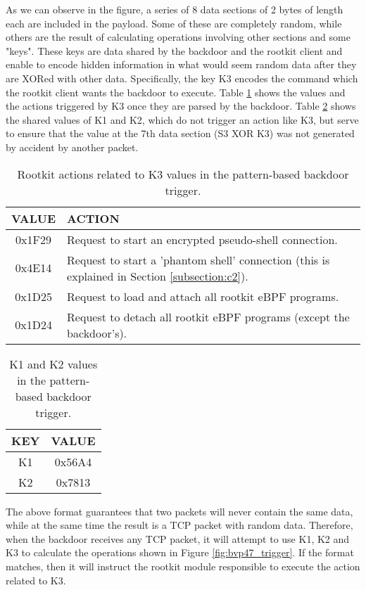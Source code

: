 As we can observe in the figure, a series of 8 data sections of 2 bytes of length each are included in the payload. Some of these are completely random, while others are the result of calculating operations involving other sections and some "keys". These keys are data shared by the backdoor and the rootkit client and enable to encode hidden information in what would seem random data after they are XORed with other data. Specifically, the key K3 encodes the command which the rootkit client wants the backdoor to execute. Table \ref{table:k3_values} shows the values and the actions triggered by K3 once they are parsed by the backdoor. Table \ref{table:k1_k2_values} shows the shared values of K1 and K2, which do not trigger an action like K3, but serve to ensure that the value at the 7th data section (S3 XOR K3) was not generated by accident by another packet.

\begin{table}[htbp]
\begin{tabular}{|c|>{\centering\arraybackslash}p{8cm}|}
\hline
\textbf{VALUE} & \textbf{ACTION}\\
\hline
\hline
0x1F29 & Request to start an encrypted pseudo-shell connection.\\
\hline
0x4E14 & Request to start a 'phantom shell' connection (this is explained in Section \ref{subsection:c2}).\\
\hline
0x1D25 & Request to load and attach all rootkit eBPF programs.\\
\hline
0x1D24 & Request to detach all rootkit eBPF programs (except the backdoor's).\\
\hline
\end{tabular}
\caption{Rootkit actions related to K3 values in the pattern-based backdoor trigger.}
\label{table:k3_values}
\end{table}

\begin{table}[htbp]
\begin{tabular}{|c|c|}
\hline
\textbf{KEY} & \textbf{VALUE}\\
\hline
\hline
K1 & 0x56A4\\
\hline
K2 & 0x7813\\
\hline
\end{tabular}
\caption{K1 and K2 values in the pattern-based backdoor trigger.}
\label{table:k1_k2_values}
\end{table}

The above format guarantees that two packets will never contain the same data, while at the same time the result is a TCP packet with random data. Therefore, when the backdoor receives any TCP packet, it will attempt to use K1, K2 and K3 to calculate the operations shown in Figure \ref{fig:bvp47_trigger}. If the format matches, then it will instruct the rootkit module responsible to execute the action related to K3.

